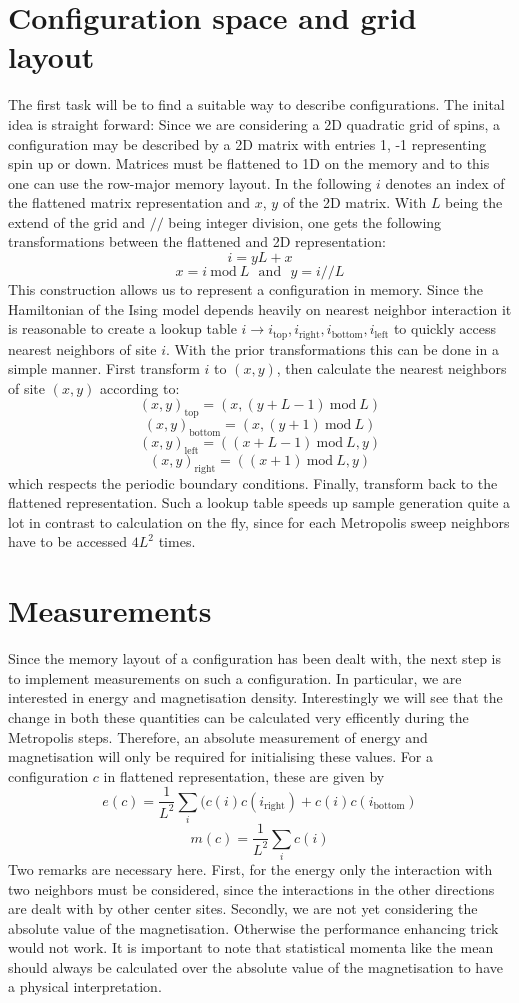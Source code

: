 \documentclass[11pt, a4paper]{scrartcl}
\newcommand{\mod}{\ \mathrm{mod} \ }
\begin{document}
\section{Configuration space and grid layout}
The first task will be to find a suitable way to describe configurations. The inital idea is straight forward: Since we are considering a 2D quadratic grid of spins, a configuration may be described by a 2D matrix with entries {1, -1} representing spin up or down. Matrices must be flattened to 1D on the memory and to this one can use the row-major memory layout. In the following $i$ denotes an index of the flattened matrix representation and $x$, $y$ of the 2D matrix. With $L$ being the extend of the grid and $//$ being integer division, one gets the following transformations between the flattened and 2D representation:
$$
i = yL + x
$$
$$
x = i \mod L \ \ \ \mathrm{and} \ \ \ y = i // L
$$
This construction allows us to represent a configuration in memory. Since the Hamiltonian of the Ising model depends heavily on nearest neighbor interaction it is reasonable to create a lookup table $i \rightarrow {i_{\mathrm{top}}, i_{\mathrm{right}}, i_{\mathrm{bottom}}, i_{\mathrm{left}}}$ to quickly access nearest neighbors of site $i$. With the prior transformations this can be done in a simple manner. First transform $i$ to $(x,y)$, then calculate the nearest neighbors of site $(x,y)$ according to:
$$
(x,y)_{\mathrm{top}} = (x, (y+L-1) \mod L)
$$
$$
(x,y)_{\mathrm{bottom}} = (x, (y+1) \mod L)
$$
$$
(x,y)_{\mathrm{left}} = ((x+L-1) \mod L, y)
$$
$$
(x,y)_{\mathrm{right}} = ((x+1) \mod L, y)
$$
which respects the periodic boundary conditions. Finally, transform back to the flattened representation. Such a lookup table speeds up sample generation quite a lot in contrast to calculation on the fly, since for each Metropolis sweep neighbors have to be accessed $4 L^2$ times.

\section{Measurements}
Since the memory layout of a configuration has been dealt with, the next step is to implement measurements on such a configuration. In particular, we are interested in energy and magnetisation density. Interestingly we will see that the change in both these quantities can be calculated very efficently during the Metropolis steps. Therefore, an absolute measurement of energy and magnetisation will only be required for initialising these values. For a configuration $c$ in flattened representation, these are given by
$$
e(c) = \frac{1}{L^2}\sum_i ( c(i)c(i_{\mathrm{right}}) + c(i)c(i_{\mathrm{bottom}})
$$
$$
m(c) = \frac{1}{L^2} \sum_i c(i)
$$
Two remarks are necessary here. First, for the energy only the interaction with two neighbors must be considered, since the interactions in the other directions are dealt with by other center sites. Secondly, we are not yet considering the absolute value of the magnetisation. Otherwise the performance enhancing trick would not work. It is important to note that statistical momenta like the mean should always be calculated over the absolute value of the magnetisation to have a physical interpretation.
\end{document}

